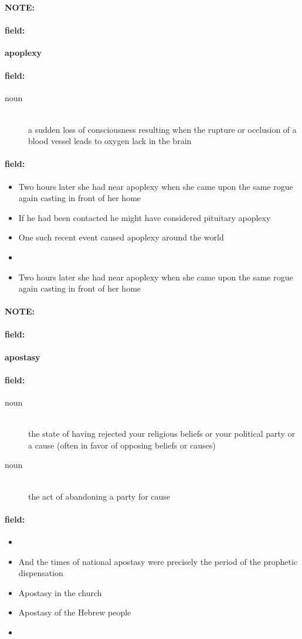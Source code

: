 \documentclass[12pt]{article}
\newenvironment{note}{\paragraph{NOTE:}}{}
\newenvironment{field}{\paragraph{field:}}{}
\begin{document}
\begin{note}
\begin{field}
\textbf{\large apoplexy}
\end{field}


\begin{field}
\begin{description}
\item[noun] \hfill \\ 
a sudden loss of consciousness resulting when the rupture or occlusion of a blood vessel leads to oxygen lack in the brain

\end{description}
\end{field}

\begin{field}
\begin{itemize}
\item Two hours later she had near apoplexy when she came upon the same rogue again casting in front of her home
\item If he had been contacted he might have considered pituitary apoplexy
\item One such recent event caused apoplexy around the world
\item 
\item Two hours later she had near apoplexy when she came upon the same rogue again casting in front of her home
\end{itemize}
\end{field}
\end{note}
\begin{note}
\begin{field}
\textbf{\large apostasy}
\end{field}


\begin{field}
\begin{description}
\item[noun] \hfill \\ 
the state of having rejected your religious beliefs or your political party or a cause (often in favor of opposing beliefs or causes)

\item[noun] \hfill \\ 
the act of abandoning a party for cause

\end{description}
\end{field}

\begin{field}
\begin{itemize}
\item 
\item And the times of national apostasy were precisely the period of the prophetic dispensation
\item Apostasy in the church
\item Apostasy of the Hebrew people
\item  
\end{itemize}
\end{field}
\end{note}
\end{document}
